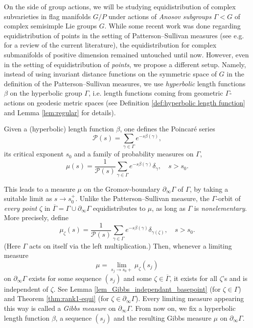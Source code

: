 \documentclass[12pt]{amsbook}%
\theoremstyle{definition}
\theoremstyle{remark}
\numberwithin{section}{chapter}
\numberwithin{subsection}{section}
\numberwithin{figure}{chapter}
\def\cP{{\mathscr{P}}}
\def\Ga{\Gamma}
\def\geo{\partial_\infty}
\def\ol{\overline}
\begin{document}
{On the side of group actions,} we will be studying equidistribution of complex subvarieties in flag manifolds $G/P$ under actions of 
{\em Anosov subgroups} $\Gamma<G$ of complex semisimple Lie groups $G$. While some recent work was done regarding equidistribution of points in the setting of Patterson--Sullivan measures (see e.g. \cite{Dey-Kapovich} for a  review of the current literature), the equidistribution for complex submanifolds of positive dimension remained untouched until now. However, even in the setting of equidistribution of {\em points}, we propose a different setup. Namely, instead of using invariant distance functions on the symmetric space of $G$ in the definition of the Patterson--Sullivan measures, we use {\em hyperbolic} length functions $\beta$ on the hyperbolic group $\Gamma$, i.e. length functions coming from geometric $\Ga$-actions on geodesic metric spaces (see Definition \ref{def:hyperbolic length function} and Lemma \ref{lem:regular} for details). 

Given a (hyperbolic) length function $\beta$, one defines the Poincar\'e series \index{Poincar\'e series $\cP(s)$}
$$
\cP(s)=\sum_{\gamma\in \Gamma}e^{-s\beta(\gamma)},
$$
its critical exponent $s_0$ and a family of probability measures on $\Gamma$, 
$$
 \mu(s) = \frac{1}{\cP(s)}\sum_{\gamma\in \Gamma}e^{-s\beta(\gamma)}\delta_{\gamma}, \quad s> s_0. 
$$

This leads to a measure $\mu$ on the Gromov-boundary $\geo\Gamma$ 
of $\Gamma$, by taking a suitable limit as $s\to s_0^+$. Unlike the  Patterson--Sullivan measure, 
the $\Gamma$-orbit of {\em every point} $\zeta$ in 
$\overline\Gamma= \Gamma\cup \geo \Gamma$ equidistributes to $\mu$, as long as $\Gamma$ is {\em nonelementary}. 
More precisely, define 
$$
 \mu_\zeta(s) = \frac{1}{\cP(s)}\sum_{\gamma\in \Gamma}e^{-s\beta(\gamma)}\delta_{\gamma(\zeta)}, \quad s> s_0. 
$$
(Here $\Ga$ acts on itself via the left multiplication.) 
Then, whenever a limiting measure  
$$
\mu= \lim_{s_j\to s_0+} \mu_\zeta(s_j)
$$ 
on $\geo \Gamma$ exists for some sequence $(s_j)$ and some $\zeta\in \ol\Ga$, it exists for all $\zeta$'s and is independent of $\zeta$. 
See Lemma \ref{lem_Gibbs_independant_basepoint} (for $\zeta\in \Ga$) and Theorem \ref{thm:rank1-equi} (for $\zeta\in \geo \Ga$).  
Every limiting measure appearing this way is called a {\em Gibbs measure} on $\geo \Ga$. From now on, we fix a hyperbolic length function $\beta$,  
a sequence $(s_j)$ and the resulting Gibbs measure $\mu$ on $\geo \Ga$. 
\end{document}
